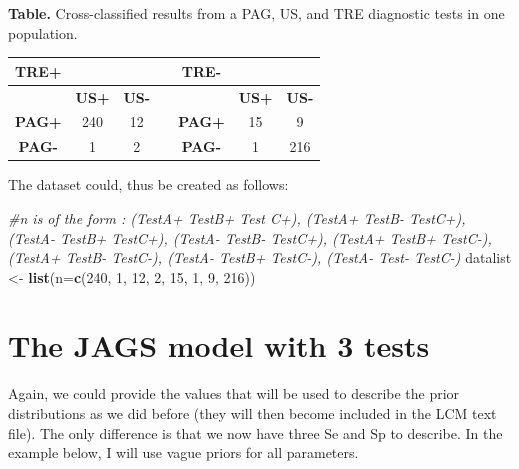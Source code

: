 \documentclass[
]{book}
\newenvironment{Shaded}{\begin{snugshade}}{\end{snugshade}}
\newcommand{\AttributeTok}[1]{\textcolor[rgb]{0.13,0.29,0.53}{#1}}
\newcommand{\CommentTok}[1]{\textcolor[rgb]{0.56,0.35,0.01}{\textit{#1}}}
\newcommand{\DecValTok}[1]{\textcolor[rgb]{0.00,0.00,0.81}{#1}}
\newcommand{\FunctionTok}[1]{\textcolor[rgb]{0.13,0.29,0.53}{\textbf{#1}}}
\newcommand{\NormalTok}[1]{#1}
\newcommand{\OtherTok}[1]{\textcolor[rgb]{0.56,0.35,0.01}{#1}}
\begin{document}
\textbf{Table.} Cross-classified results from a PAG, US, and TRE diagnostic tests in one population.

\begin{longtable}[]{@{}ccccccc@{}}
\toprule\noalign{}
\textbf{TRE+} & & & & \textbf{TRE-} & & \\
\midrule\noalign{}
\endhead
\bottomrule\noalign{}
\endlastfoot
& \textbf{US+} & \textbf{US-} & & & \textbf{US+} & \textbf{US-} \\
\textbf{PAG+} & 240 & 12 & & \textbf{PAG+} & 15 & 9 \\
\textbf{PAG-} & 1 & 2 & & \textbf{PAG-} & 1 & 216 \\
\end{longtable}

The dataset could, thus be created as follows:

\begin{Shaded}
\begin{Highlighting}[]
\CommentTok{\#n is of the form : (TestA+ TestB+ Test C+), (TestA+ TestB{-} TestC+), (TestA{-} TestB+ TestC+), (TestA{-} TestB{-} TestC+), (TestA+ TestB+ TestC{-}), (TestA+ TestB{-} TestC{-}), (TestA{-} TestB+ TestC{-}), (TestA{-} Test{-} TestC{-})}
\NormalTok{datalist }\OtherTok{\textless{}{-}} \FunctionTok{list}\NormalTok{(}\AttributeTok{n=}\FunctionTok{c}\NormalTok{(}\DecValTok{240}\NormalTok{, }\DecValTok{1}\NormalTok{, }\DecValTok{12}\NormalTok{, }\DecValTok{2}\NormalTok{, }\DecValTok{15}\NormalTok{, }\DecValTok{1}\NormalTok{, }\DecValTok{9}\NormalTok{, }\DecValTok{216}\NormalTok{))}
\end{Highlighting}
\end{Shaded}

\section{The JAGS model with 3 tests}\label{the-jags-model-with-3-tests}

Again, we could provide the values that will be used to describe the prior distributions as we did before (they will then become included in the LCM text file). The only difference is that we now have three Se and Sp to describe. In the example below, I will use vague priors for all parameters.
\end{document}
